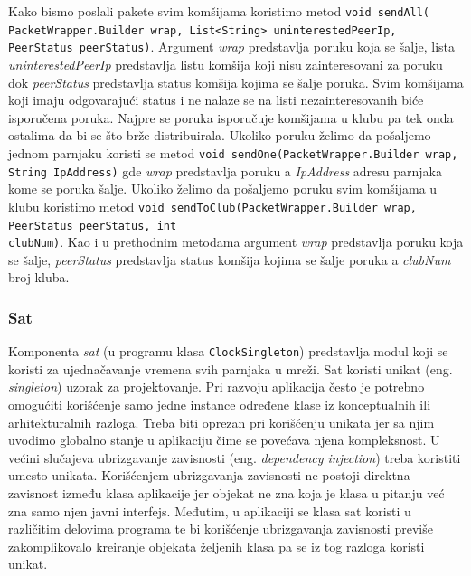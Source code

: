 \documentclass[12pt,oneside]{memoir}
\begin{document}
Kako bismo poslali pakete svim komšijama koristimo metod \texttt{void sendAll(\\PacketWrapper.Builder wrap, List<String> uninterestedPeerIp, \\PeerStatus peerStatus)}. Argument \textit{wrap} predstavlja poruku koja se šalje, lista \textit{uninterestedPeerIp} predstavlja listu komšija koji nisu zainteresovani za poruku dok \textit{peerStatus} predstavlja status komšija kojima se šalje poruka. Svim komšijama koji imaju odgovarajući status i ne nalaze se na listi nezainteresovanih biće isporučena poruka. Najpre se poruka isporučuje komšijama u klubu pa tek onda ostalima da bi se što brže distribuirala. Ukoliko poruku želimo da pošaljemo jednom parnjaku koristi se metod \texttt{void sendOne(PacketWrapper.Builder wrap, String IpAddress)} gde \textit{wrap} predstavlja poruku a \textit{IpAddress} adresu parnjaka kome se poruka šalje. Ukoliko želimo da pošaljemo poruku svim komšijama u klubu koristimo metod \texttt{void sendToClub(PacketWrapper.Builder wrap, PeerStatus peerStatus, int \\clubNum)}. Kao i u prethodnim metodama argument \textit{wrap} predstavlja poruku koja se šalje, \textit{peerStatus} predstavlja status komšija kojima se šalje poruka a \textit{clubNum} broj kluba.


\subsubsection{Sat}
\label{implementacija.2.3.4}

Komponenta \textit{sat} (u programu klasa \texttt{ClockSingleton}) predstavlja modul koji se koristi za ujednačavanje vremena svih parnjaka u mreži. Sat koristi unikat (eng. \textit{singleton}) uzorak za projektovanje. Pri razvoju aplikacija često je potrebno omogućiti korišćenje samo jedne instance određene klase iz konceptualnih ili arhitekturalnih razloga. Treba biti oprezan pri korišćenju unikata jer sa njim uvodimo globalno stanje u aplikaciju čime se povećava njena kompleksnost. U većini slučajeva ubrizgavanje zavisnosti (eng. \textit{dependency injection}) treba koristiti umesto unikata. Korišćenjem ubrizgavanja zavisnosti ne postoji direktna zavisnost između klasa aplikacije jer objekat ne zna koja je klasa u pitanju već zna samo njen javni interfejs. Međutim, u aplikaciji se klasa sat koristi u različitim delovima programa te bi korišćenje ubrizgavanja zavisnosti previše zakomplikovalo kreiranje objekata željenih klasa pa se iz tog razloga koristi unikat.
\end{document}
